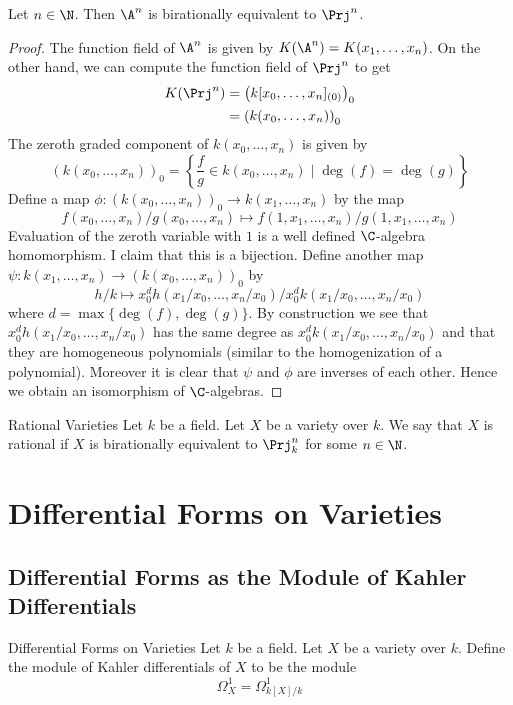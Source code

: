 \documentclass[a4paper]{article}
\begin{document}
\begin{lmm}{}{} Let $n\in\N$. Then $\A^n$ is birationally equivalent to $\Prj^n$. \tcbline
\begin{proof}
The function field of $\A^n$ is given by $K(\A^n)=K(x_1,\dots,x_n)$. On the other hand, we can compute the function field of $\Prj^n$ to get 
\begin{align*}
K(\Prj^n)&=\left(k[x_0,\dots,x_n]_{(0)}\right)_0\\
&=\left(k(x_0,\dots,x_n)\right)_0
\end{align*}
The zeroth graded component of $k(x_0,\dots,x_n)$ is given by $$(k(x_0,\dots,x_n))_0=\left\{\frac{f}{g}\in k(x_0,\dots,x_n)\;|\;\deg(f)=\deg(g)\right\}$$ Define a map $\phi:(k(x_0,\dots,x_n))_0\to k(x_1,\dots,x_n)$ by the map $$f(x_0,\dots,x_n)/g(x_0,\dots,x_n)\mapsto f(1,x_1,\dots,x_n)/g(1,x_1,\dots,x_n)$$ Evaluation of the zeroth variable with $1$ is a well defined $\C$-algebra homomorphism. I claim that this is a bijection. Define another map $\psi:k(x_1,\dots,x_n)\to(k(x_0,\dots,x_n))_0$ by $$h/k\mapsto x_0^d h(x_1/x_0,\dots,x_n/x_0)/x_0^d k(x_1/x_0,\dots,x_n/x_0)$$ where $d=\max\{\deg(f),\deg(g)\}$. By construction we see that $x_0^d h(x_1/x_0,\dots,x_n/x_0)$ has the same degree as $x_0^d k(x_1/x_0,\dots,x_n/x_0)$ and that they are homogeneous polynomials (similar to the homogenization of a polynomial). Moreover it is clear that $\psi$ and $\phi$ are inverses of each other. Hence we obtain an isomorphism of $\C$-algebras. 
\end{proof}
\end{lmm}

\begin{defn}{Rational Varieties}{} Let $k$ be a field. Let $X$ be a variety over $k$. We say that $X$ is rational if $X$ is birationally equivalent to $\Prj_k^n$ for some $n\in\N$. 
\end{defn}

\pagebreak
\section{Differential Forms on Varieties}
\subsection{Differential Forms as the Module of Kahler Differentials}
\begin{defn}{Differential Forms on Varieties}{} Let $k$ be a field. Let $X$ be a variety over $k$. Define the module of Kahler differentials of $X$ to be the module $$\Omega_X^1=\Omega_{k[X]/k}^1$$
\end{defn}
\end{document}
